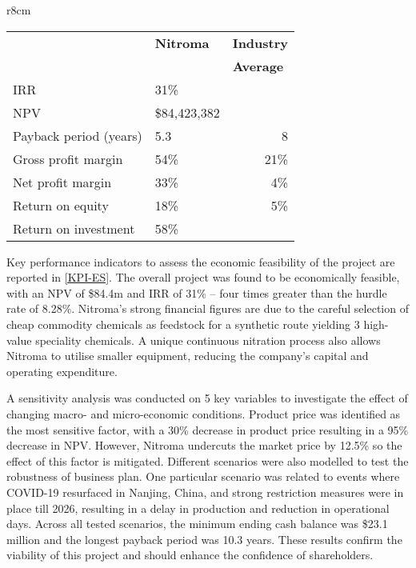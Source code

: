 \begin{wraptable}{r}{8cm}
\centering
\caption{Nitroma's KPIs compared to the industry average}
\label{KPI-ES}
\begin{tabular}{l|l|l}
\toprule
           &  \multicolumn{1}{l|}{\textbf{Nitroma}} & \multicolumn{1}{c}{\textbf{Industry}} \\
                     & \multicolumn{1}{l|}{}        & \textbf{Average}                      \\ \midrule

IRR                  & 31\%                         &                              \\
NPV                  & \$84,423,382                 &                              \\
Payback period (years)       & 5.3                          & \multicolumn{1}{r}{8}      \\
Gross profit margin  & 54\%                         & \multicolumn{1}{r}{21\%}   \\
Net profit margin    & 33\%                         & \multicolumn{1}{r}{4\%}    \\
Return on equity     & 18\%                         & \multicolumn{1}{r}{5\%}   \\
Return on investment & 58\%                         &                              \\ \bottomrule
\end{tabular}
\end{wraptable}

Key performance indicators to assess the economic feasibility of the project are reported in \cref{KPI-ES}. The overall project was found to be economically feasible, with an NPV of \$84.4m and IRR of 31\% – four times greater than the hurdle rate of 8.28\%. Nitroma’s strong financial figures are due to the careful selection of cheap commodity chemicals as feedstock for a synthetic route yielding 3 high-value speciality chemicals. A unique continuous nitration process also allows Nitroma to utilise smaller equipment, reducing the company’s capital and operating expenditure.

A sensitivity analysis was conducted on 5 key variables to investigate the effect of changing macro- and micro-economic conditions. Product price was identified as the most sensitive factor, with a 30\% decrease in product price resulting in a 95\% decrease in NPV. However, Nitroma undercuts the market price by 12.5\% so the effect of this factor is mitigated. Different scenarios were also modelled to test the robustness of business plan. One particular scenario was related to events where COVID-19 resurfaced in Nanjing, China, and strong restriction measures were in place till 2026, resulting in a delay in production and reduction in operational days. Across all tested scenarios, the minimum ending cash balance was \$23.1 million and the longest payback period was 10.3 years. These results confirm the viability of this project and should enhance the confidence of shareholders.